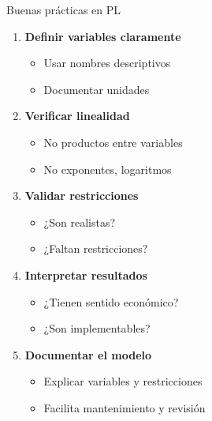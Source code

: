 \documentclass[aspectratio=169,10pt]{beamer}
\begin{document}
\begin{frame}{Buenas prácticas en PL}

\begin{enumerate}
    \item \textbf{Definir variables claramente}
    \begin{itemize}
        \item Usar nombres descriptivos
        \item Documentar unidades
    \end{itemize}

    \vspace{0.2cm}

    \item \textbf{Verificar linealidad}
    \begin{itemize}
        \item No productos entre variables
        \item No exponentes, logaritmos
    \end{itemize}

    \vspace{0.2cm}

    \item \textbf{Validar restricciones}
    \begin{itemize}
        \item ¿Son realistas?
        \item ¿Faltan restricciones?
    \end{itemize}

    \vspace{0.2cm}

    \item \textbf{Interpretar resultados}
    \begin{itemize}
        \item ¿Tienen sentido económico?
        \item ¿Son implementables?
    \end{itemize}

    \vspace{0.2cm}

    \item \textbf{Documentar el modelo}
    \begin{itemize}
        \item Explicar variables y restricciones
        \item Facilita mantenimiento y revisión
    \end{itemize}
\end{enumerate}

\end{frame}
\end{document}
